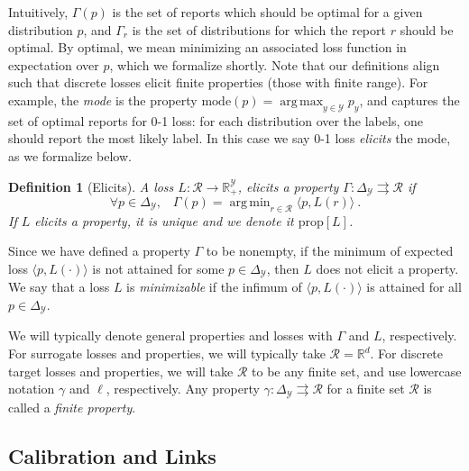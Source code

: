 \documentclass[11pt]{article}
\newcommand{\Comments}{1}
\newcommand{\mytodo}[2]{\ifnum\Comments=1%
  \todo[linecolor=#1!80!black,backgroundcolor=#1,bordercolor=#1!80!black]{#2}\fi}
\newcommand{\raft}[1]{\mytodo{green!20!white}{RF: #1}}
\newcommand{\jessiet}[1]{\mytodo{teal!20!white}{JF: #1}}
\newcommand{\reals}{\mathbb{R}}
\newcommand{\prop}[1]{\mathrm{prop}[#1]}
\newcommand{\mode}{\mathrm{mode}}
\newcommand{\simplex}{\Delta_\Y}
\newcommand{\R}{\mathcal{R}}
\newcommand{\Y}{\mathcal{Y}}
\newcommand{\inprod}[2]{\langle #1, #2 \rangle}%
\newcommand{\toto}{\rightrightarrows}
\DeclareMathOperator*{\argmax}{arg\,max}
\DeclareMathOperator*{\argmin}{arg\,min}
\newtheorem{definition}{Definition}
\begin{document}
Intuitively, $\Gamma(p)$ is the set of reports which should be optimal for a given distribution $p$, and $\Gamma_r$ is the set of distributions for which the report $r$ should be optimal.
By optimal, we mean minimizing an associated loss function in expectation over $p$, which we formalize shortly.
Note that our definitions align such that discrete losses elicit finite properties (those with finite range). %
For example, the \emph{mode} is the %
property $\mode(p) = \argmax_{y\in\Y} p_y$, and captures the set of optimal reports for 0-1 loss: for each distribution over the labels, one should report the most likely label.
In this case we say 0-1 loss \emph{elicits} the mode, as we formalize below.

\begin{definition}[Elicits]
  \label{def:elicits}
  A loss $L:\R\to\reals^\Y_+$, \emph{elicits} a property $\Gamma:\simplex \toto \R$ if
  \begin{equation}
    \forall p\in\simplex,\;\;\;\Gamma(p) = \argmin_{r \in \R} \inprod{p}{L(r)}~.
  \end{equation}
  If $L$ elicits a property, it is unique and we denote it $\prop{L}$.
\end{definition}
Since we have defined a property $\Gamma$ to be nonempty, if the minimum of expected loss $\inprod{p}{L(\cdot)}$ is not attained for some $p \in \simplex$, then $L$ does not elicit a property.
We say that a loss $L$ is \emph{minimizable} if the infimum of $\inprod{p}{L(\cdot)}$ is attained for all $p \in \simplex$.

We will typically denote general properties and losses with $\Gamma$ and $L$, respectively.
For surrogate losses and properties, we will typically take $\R = \reals^d$.
For discrete target losses and properties, we will take $\R$ to be any finite set, and use lowercase notation $\gamma$ and $\ell$, respectively.
Any property $\gamma:\simplex\toto\R$ for a finite set $\R$ is called a \emph{finite property}.


\subsection{Calibration and Links}
\label{subsec:calibration-links}
\end{document}
